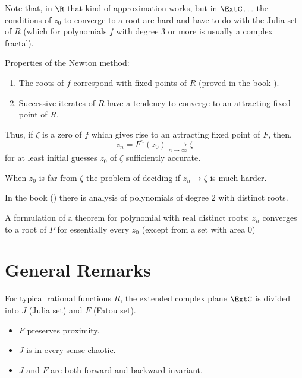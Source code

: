 Note that, in $\R$ that kind of approximation works, but in $\ExtC\ldots$ the
conditions of $z_0$ to converge to a root are hard and have to do with the Julia
set of $R$ (which for polynomials $f$ with degree $3$ or more is usually a
complex fractal).

Properties of the Newton method:
\begin{enumerate}
    \item The roots of $f$ correspond with fixed points of $R$ (proved in the
    book \cite{Beardon1991}).
    \item Successive iterates of $R$ have a tendency to converge to an
    attracting fixed point of $R$.
\end{enumerate}

Thus, if $\zeta$ is a zero of $f$ which gives rise to an attracting fixed point
of $F$, then,
\[
    z_n = F^n(z_0) \xrightarrow[n \to \infty]{} \zeta
\]
for at least initial guesses $z_0$ of $\zeta$ sufficiently accurate.

When $z_0$ is far from $\zeta$ the problem of deciding if $z_n \to \zeta$ is
much harder.

In the book (\cite{Beardon1991}) there is analysis of polynomials of degree $2$
with distinct roots.

A formulation of a theorem for polynomial with real distinct roots: $z_n$
converges to a root of $P$ for essentially every $z_0$ (except from a set with
area $0$)

\section{General Remarks}
For typical rational functions $R$, the extended complex plane $\ExtC$ is
divided into $J$ (Julia set) and $F$ (Fatou set).
\begin{itemize}
    \item $F$ preserves proximity.
    \item $J$ is in every sense chaotic.
    \item $J$ and $F$ are both forward and backward invariant.
\end{itemize}
